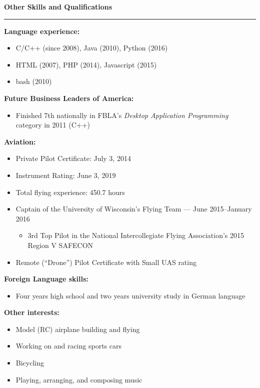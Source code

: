 \documentclass[12pt,letterpaper]{article}
\newenvironment{details}{
    \vspace{-.8em}
    \begin{itemize}
        \renewcommand \labelitemi{\labelitemiv}
        \setlength{\itemsep}{0pt}
        \setlength{\parskip}{-1pt}
        \setlength{\parsep}{0pt}
    }{
    \end{itemize}
    \vspace{-.5em}
}
\newcommand{\hr} {
    \vspace{-1em}
    \par\rule{\textwidth}{1pt}
    \vspace{-1.5em}
}
\newcommand{\ressection}[1] {
    \par{\large \textbf{#1}}
    \hr
}
\newenvironment{other} {
    \ressection{Other Skills and Qualifications}
    \setlength{\parskip}{3pt}
}{
    \vspace{0.5em}
}
\begin{document}
\begin{other}
\par \textbf{Language experience:}
\begin{details}
    \item C/C++ (since 2008), Java (2010), Python (2016)
    \item HTML (2007), PHP (2014), Javascript (2015)
    \item bash (2010)
\end{details}
\par \textbf{Future Business Leaders of America:}
\begin{details}
    \item Finished 7th nationally in FBLA's \textit{Desktop Application Programming} category in 2011 (C++)
\end{details}

\par \textbf{Aviation:}
\begin{details}
    \item Private Pilot Certificate: July 3, 2014
    \item Instrument Rating: June 3, 2019
    \item Total flying experience: 450.7 hours
    \item Captain of the University of Wisconsin's Flying Team --- June 2015--January 2016
    \vspace{.5em}
    \begin{details}
        \item 3rd Top Pilot in the National Intercollegiate Flying Association's 2015 Region V SAFECON
    \end{details}
    \item Remote (``Drone'') Pilot Certificate with Small UAS rating
\end{details}

\par \textbf{Foreign Language skills:}
\begin{details}
    \item Four years high school and two years university study in German language
\end{details}

\par \textbf{Other interests:}
\begin{details}
    \item Model (RC) airplane building and flying
    \item Working on and racing sports cars
    \item Bicycling
    \item Playing, arranging, and composing music
\end{details}

\end{other}
\end{document}
